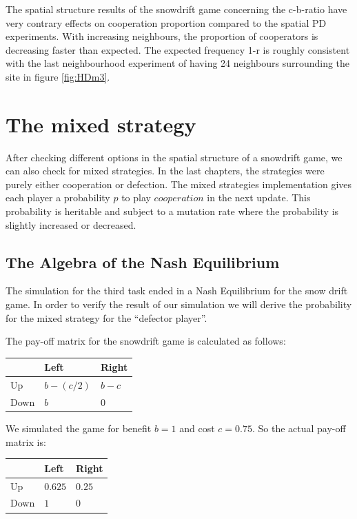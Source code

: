 \documentclass[DIV=calc, paper=a4, fontsize=11pt, twocolumn]{scrartcl}	 %
\begin{document}
The spatial structure results of the snowdrift game concerning the c-b-ratio have very contrary effects on cooperation proportion compared to the spatial PD experiments. With increasing neighbours, the proportion of cooperators is decreasing faster than expected. The expected frequency 1-r is roughly consistent with the last neighbourhood experiment of having 24 neighbours surrounding the site in figure \ref{fig:HDm3}.  \\

\section*{The mixed strategy}

After checking different options in the spatial structure of a snowdrift game, we can also check for mixed strategies. In the last chapters, the strategies were purely either cooperation or defection. The mixed strategies implementation gives each player a probability $p$ to play $cooperation$ in the next update. This probability is heritable and subject to a mutation rate where the probability is slightly increased or decreased. \\



\subsection*{The Algebra of the Nash Equilibrium}

The simulation for the third task ended in a Nash Equilibrium
for the snow drift game. In order to verify the result of our
simulation we will derive the probability for the mixed strategy
for the ``defector player''.

The pay-off matrix for the snowdrift game is calculated as follows:\\

\begin{tabular}{l|ll}
  & Left & Right \\
\midrule
Up & $b-(c/2)$ & $b-c$ \\
Down & $b$ & $0$ \\
\end{tabular}

We simulated the game for benefit $b=1$ and cost $c=0.75$.
So the actual pay-off matrix is:\\

\begin{tabular}{l|ll}
  & Left & Right \\
\midrule
Up & $0.625$ & $0.25$ \\
Down & $1$ & $0$ \\
\end{tabular}
\end{document}
